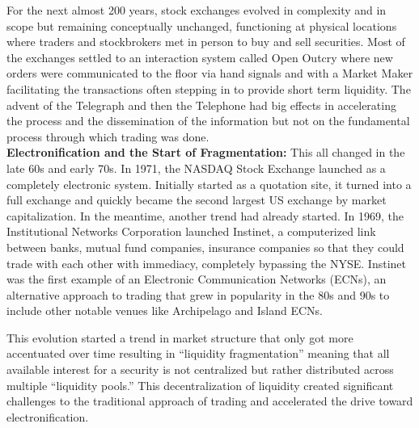 For the next almost 200 years, stock exchanges evolved in complexity and in scope but remaining conceptually unchanged, functioning at physical locations where traders and stockbrokers met in person to buy and sell securities. Most of the exchanges settled to an interaction system called Open Outcry where new orders were communicated to the floor via hand signals and with a Market Maker facilitating the transactions often stepping in to provide short term liquidity. The advent of the Telegraph and then the Telephone had big effects in accelerating the process and the dissemination of the information but not on the fundamental process through which trading was done. \\


\noindent\textbf{Electronification and the Start of Fragmentation:} This all changed in the late 60s and early 70s. In 1971, the NASDAQ Stock Exchange launched as a completely electronic system. Initially started as a quotation site, it turned into a full exchange and  quickly became the second largest US exchange by market capitalization. In the meantime, another trend had already started. In 1969, the Institutional Networks Corporation launched Instinet, a computerized link between banks, mutual fund companies, insurance companies so that they could trade with each other with immediacy, completely bypassing the NYSE. Instinet was the first example of an Electronic Communication Networks (ECNs), an alternative approach to trading that grew in popularity in the 80s and 90s to include other notable venues like Archipelago and Island ECNs.


This evolution started a trend in market structure that only got more accentuated over time resulting in ``liquidity fragmentation'' meaning that all available interest for a security is not centralized but rather distributed across multiple ``liquidity pools.''  This decentralization of liquidity created significant challenges to the traditional approach of trading and accelerated the drive toward electronification. \\


